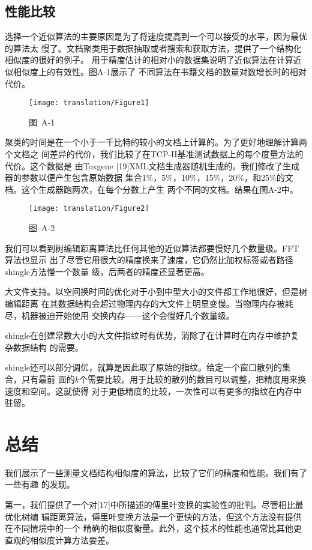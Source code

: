 \subsection{性能比较}
选择一个近似算法的主要原因是为了将速度提高到一个可以接受的水平，因为最优的算法太
慢了。文档聚类用于数据抽取或者搜索和获取方法，提供了一个结构化相似度的很好的例子。
用于精度估计的相对小的数据集说明了近似算法在计算近似相似度上的有效性。图A-1展示了
不同算法在书籍文档的数量对数增长时的相对代价。

\begin{figure}[h]
  \centering
  \texttt{[image: translation/Figure1]}
  \caption*{图~A-1}
\end{figure}

聚类的时间是在一个小于一千比特的较小的文档上计算的。为了更好地理解计算两个文档之
间差异的代价，我们比较了在TCP-H基准测试数据上的每个度量方法的代价。这个数据是
由Toxgene [19]XML文档生成器随机生成的。我们修改了生成器的参数以便产生包含原始数据
集合1\%，5\%，10\%，15\%，20\%，和25\%的文档。这个生成器跑两次，在每个分数上产生
两个不同的文档。结果在图A-2中。
\begin{figure}[h]
  \centering
  \texttt{[image: translation/Figure2]}
  \caption*{图~A-2}
\end{figure}

我们可以看到树编辑距离算法比任何其他的近似算法都要慢好几个数量级。FFT算法也显示
出了尽管它用很大的精度换来了速度，它仍然比加权标签或者路径shingle方法慢一个数量
级，后两者的精度还显著更高。

大文件支持。以空间换时间的优化对于小到中型大小的文件都工作地很好，但是树编辑距离
在其数据结构会超过物理内存的大文件上明显变慢。当物理内存被耗尽，机器被迫开始使用
交换内存——这个会慢好几个数量级。

shingle在创建常数大小的大文件指纹时有优势，消除了在计算时在内存中维护复杂数据结构
的需要。

shingle还可以部分调优，就算是因此取了原始的指纹。给定一个窗口散列的集合，只有最前
面的$k$个需要比较。用于比较的散列的数目可以调整，把精度用来换速度和空间。这就使得
对于更低精度的比较，一次性可以有更多的指纹在内存中驻留。

\section{总结}
我们展示了一些测量文档结构相似度的算法，比较了它们的精度和性能。我们有了一些有趣
的发现。

第一，我们提供了一个对[17]中所描述的傅里叶变换的实验性的批判。尽管相比最优化树编
辑距离算法，傅里叶变换方法是一个更快的方法，但这个方法没有提供在不同情境中的一个
精确的相似度衡量。此外，这个技术的性能也通常比其他更直观的相似度计算方法要差。

